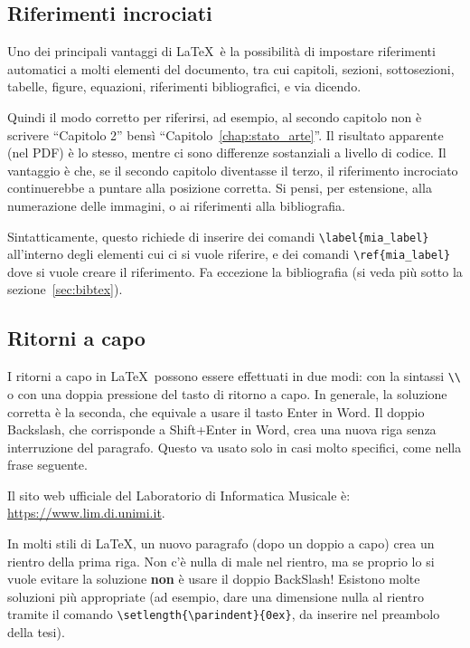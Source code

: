 \documentclass[12pt,italian]{report}
\begin{document}
\subsection{Riferimenti incrociati}

Uno dei principali vantaggi di \LaTeX\ è la possibilità di impostare riferimenti automatici a molti elementi del documento, tra cui capitoli, sezioni, sottosezioni, tabelle, figure, equazioni, riferimenti bibliografici, e via dicendo.

Quindi il modo corretto per riferirsi, ad esempio, al secondo capitolo non è scrivere ``Capitolo 2'' bensì ``Capitolo~\ref{chap:stato_arte}''. Il risultato apparente (nel PDF) è lo stesso, mentre ci sono differenze sostanziali a livello di codice. Il vantaggio è che, se il secondo capitolo diventasse il terzo, il riferimento incrociato continuerebbe a puntare alla posizione corretta. Si pensi, per estensione, alla numerazione delle immagini, o ai riferimenti alla bibliografia.

Sintatticamente, questo richiede di inserire dei comandi \verb|\label{mia_label}| all'interno degli elementi cui ci si vuole riferire, e dei comandi \verb|\ref{mia_label}| dove si vuole creare il riferimento. Fa eccezione la bibliografia (si veda pi\`u sotto la sezione~\ref{sec:bibtex}).


\subsection{Ritorni a capo}

I ritorni a capo in \LaTeX\ possono essere effettuati in due modi: con la sintassi \verb|\\| o con una doppia pressione del tasto di ritorno a capo. In generale, la soluzione corretta è la seconda, che equivale a usare il tasto Enter in Word. Il doppio Backslash, che corrisponde a Shift+Enter in Word, crea una nuova riga senza interruzione del paragrafo. Questo va usato solo in casi molto specifici, come nella frase seguente.

Il sito web ufficiale del Laboratorio di Informatica Musicale è:\\
\url{https://www.lim.di.unimi.it}.

In molti stili di \LaTeX, un nuovo paragrafo (dopo un doppio a capo) crea un rientro della prima riga. Non c'\`e nulla di male nel rientro, ma se proprio lo si vuole evitare la soluzione \textbf{non} \`e usare il doppio BackSlash! Esistono molte soluzioni pi\`u appropriate (ad esempio, dare una dimensione nulla al rientro tramite il comando \verb|\setlength{\parindent}{0ex}|, da inserire nel preambolo della tesi).
\end{document}
